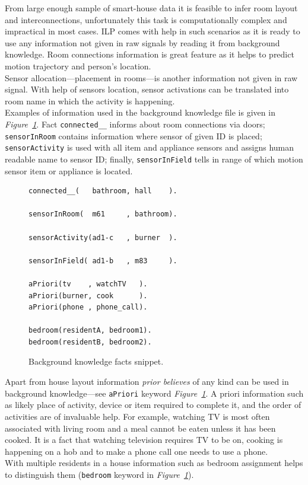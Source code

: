 \documentclass[11pt, a4paper, pdflatex, leqno, twoside, openright]{report}
\begin{document}
From large enough sample of smart-house data it is feasible to infer room layout and interconnections, unfortunately this task is computationally complex and impractical in most cases. ILP comes with help in such scenarios as it is ready to use any information not given in raw signals by reading it from background knowledge. Room connections information is great feature as it helps to predict motion trajectory and person's location.\\
Sensor allocation---placement in rooms---is another information not given in raw signal. With help of sensors location, sensor activations can be translated into room name in which the activity is happening.\\
Examples of information used in the background knowledge file is given in \emph{Figure~\ref{lst:bg}}. Fact \texttt{connected\_\_} informs about room connections via doors; \texttt{sensorInRoom} contains information where sensor of given ID is placed; \texttt{sensorActivity} is used with all item and appliance sensors and assigns human readable name to sensor ID; finally, \texttt{sensorInField} tells in range of which motion sensor item or appliance is located.\\

\begin{figure}[htb] %
  \begin{verbatim}
connected__(   bathroom, hall    ).

sensorInRoom(  m61     , bathroom).

sensorActivity(ad1-c   , burner  ).

sensorInField( ad1-b   , m83     ).

aPriori(tv    , watchTV   ).
aPriori(burner, cook      ).
aPriori(phone , phone_call).

bedroom(residentA, bedroom1).
bedroom(residentB, bedroom2).
  \end{verbatim}
  \caption{Background knowledge facts snippet.\label{lst:bg}}
\end{figure}

Apart from house layout information \emph{prior believes} of any kind can be used in background knowledge---see \texttt{aPriori} keyword \emph{Figure~\ref{lst:bg}}. A priori information such as likely place of activity, device or item required to complete it, and the order of activities are of invaluable help. For example, watching TV is most often associated with living room and a meal cannot be eaten unless it has been cooked. It is a fact that watching television requires TV to be on, cooking is happening on a hob and to make a phone call one needs to use a phone.\\
With multiple residents in a house information such as bedroom assignment helps to distinguish them (\texttt{bedroom} keyword in \emph{Figure~\ref{lst:bg}}).\\
\end{document}
